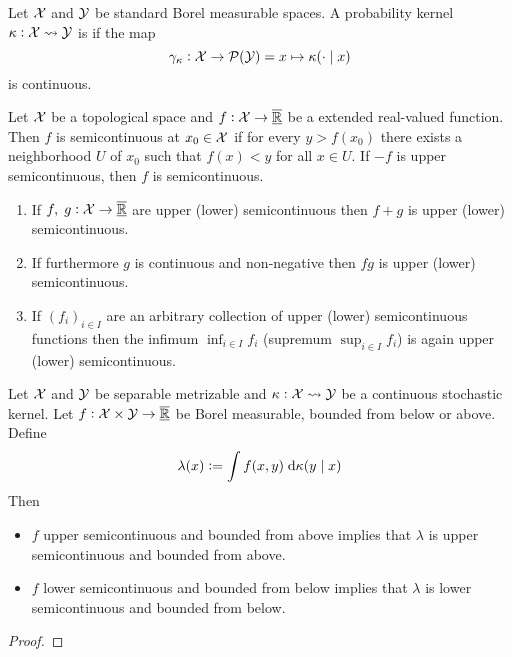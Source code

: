 \begin{defn}
  Let $\mathcal{X}$ and $\mathcal{Y}$ be standard Borel measurable spaces.
  A probability kernel $\kappa : \mathcal{X} \leadsto \mathcal{Y}$ is
   if the map
  \[ \gamma_\kappa : \mathcal{X} \to \mathcal{P}(\mathcal{Y})
  = x \mapsto \kappa(\cdot \mid x) \]
  is continuous.
\end{defn}

\begin{defn}[Semicontinuity]
  Let $\mathcal{X}$ be a topological space and $f : \mathcal{X} \to \overline{\underline{\mathbb{R}}}$ be a
  extended real-valued function.
  Then $f$ is  semicontinuous
  at $x_0 \in \mathcal{X}$ if for every $y > f(x_0)$ there exists a neighborhood
  $U$ of $x_0$ such that $f(x) < y$ for all $x \in U$.
  If $-f$ is upper semicontinuous, then $f$ is  semicontinuous.
\end{defn}

\begin{prop}
  \leavevmode
  \begin{enumerate}
    \item If $f,\; g : \mathcal{X} \to \overline{\underline{\mathbb{R}}}$ are upper (lower) semicontinuous then
  $f + g$ is upper (lower) semicontinuous.
\item If furthermore $g$ is continuous and non-negative then
$fg$ is upper (lower) semicontinuous.
\item If $(f_i)_{i \in I}$ are an arbitrary collection of upper (lower)
  semicontinuous functions then the infimum $\inf_{i \in I} f_i$
  (supremum $\sup_{i \in I} f_i$) is again upper (lower) semicontinuous.
  \end{enumerate}
  \label{prop:sumProdSemiC}
\end{prop}

\begin{prop}
  Let $\mathcal{X}$ and $\mathcal{Y}$ be separable metrizable and
  $\kappa : \mathcal{X} \leadsto \mathcal{Y}$ be a continuous stochastic
  kernel. Let $f : \mathcal{X} \times \mathcal{Y} \to \overline{\underline{\mathbb{R}}}$ be Borel measurable,
  bounded from below or above. Define
  \[ \lambda(x) \vcentcolon= \int f(x, y) \; \mathrm{d} \kappa(y \mid x) \]
  Then
  \begin{itemize}
    \item $f$ upper semicontinuous and bounded from above implies that
      $\lambda$ is upper semicontinuous and bounded from above.
    \item $f$ lower semicontinuous and bounded from below implies that
      $\lambda$ is lower semicontinuous and bounded from below.
  \end{itemize}
  \label{prop:intSemiC}
\end{prop}
\begin{proof}
\end{proof}

